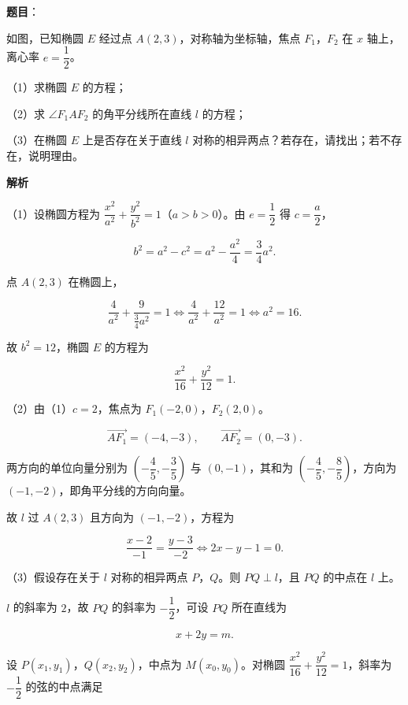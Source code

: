 \begin{answer}

\textbf{题目}：

如图，已知椭圆 $E$ 经过点 $A(2,3)$，对称轴为坐标轴，焦点 $F_1$，$F_2$ 在 $x$ 轴上，离心率 $e=\dfrac12$。

（1）求椭圆 $E$ 的方程；

（2）求 $\angle F_1AF_2$ 的角平分线所在直线 $l$ 的方程；

（3）在椭圆 $E$ 上是否存在关于直线 $l$ 对称的相异两点？若存在，请找出；若不存在，说明理由。
\nopagebreak[4]
\begin{center}\end{center}
\nopagebreak[4]
\textbf{解析}

（1）设椭圆方程为 $\dfrac{x^2}{a^2}+\dfrac{y^2}{b^2}=1$（$a>b>0$）。由 $e=\dfrac12$ 得 $c=\dfrac a2$，

\nopagebreak[4]
\[b^2=a^2-c^2=a^2-\frac{a^2}4=\frac34a^2.\]

点 $A(2,3)$ 在椭圆上，

\nopagebreak[4]
\[\frac4{a^2}+\frac9{\frac34a^2}=1
\iff \frac4{a^2}+\frac{12}{a^2}=1
\iff a^2=16.\]

故 $b^2=12$，椭圆 $E$ 的方程为

\nopagebreak[4]
\[\frac{x^2}{16}+\frac{y^2}{12}=1.\]

（2）由（1）$c=2$，焦点为 $F_1(-2,0)$，$F_2(2,0)$。

\nopagebreak[4]
\[\overrightarrow{AF_1}=(-4,-3),\qquad \overrightarrow{AF_2}=(0,-3).\]

两方向的单位向量分别为 $\left(-\dfrac45,-\dfrac35\right)$ 与 $(0,-1)$，其和为 $\left(-\dfrac45,-\dfrac85\right)$，方向为 $(-1,-2)$，即角平分线的方向向量。

故 $l$ 过 $A(2,3)$ 且方向为 $(-1,-2)$，方程为

\nopagebreak[4]
\[\frac{x-2}{-1}=\frac{y-3}{-2}
\iff 2x-y-1=0.\]

（3）假设存在关于 $l$ 对称的相异两点 $P$，$Q$。则 $PQ\perp l$，且 $PQ$ 的中点在 $l$ 上。

$l$ 的斜率为 $2$，故 $PQ$ 的斜率为 $-\dfrac12$，可设 $PQ$ 所在直线为

\nopagebreak[4]
\[x+2y=m.\]

设 $P(x_1,y_1)$，$Q(x_2,y_2)$，中点为 $M(x_0,y_0)$。对椭圆 $\dfrac{x^2}{16}+\dfrac{y^2}{12}=1$，斜率为 $-\dfrac12$ 的弦的中点满足


\end{answer}
